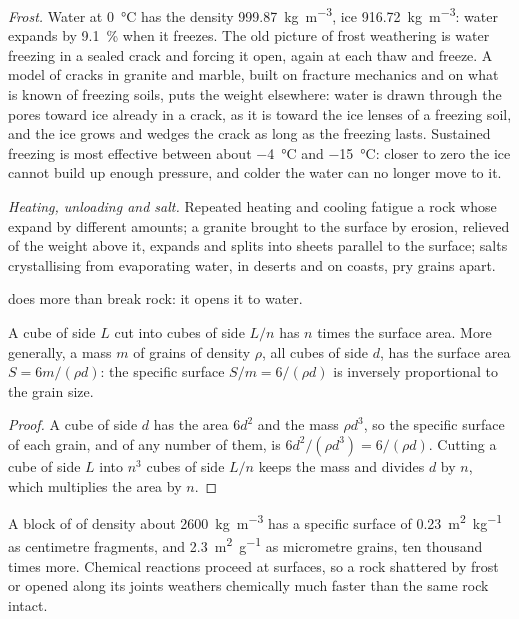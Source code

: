 \emph{Frost.} Water at \qty{0}{\celsius} has the density
\qty{999.87}{kg.m^{-3}}, ice \qty{916.72}{kg.m^{-3}}: water expands by
\qty{9.1}{\percent} when it freezes. The old picture of frost weathering is
water freezing in a sealed crack and forcing it open, again at each thaw and
freeze. A model of cracks in granite and marble, built on fracture mechanics
and on what is known of freezing soils, puts the weight elsewhere: water is
drawn through the pores toward ice already in a crack, as it is toward the
ice lenses of a freezing soil, and the ice grows and wedges the crack as long
as the freezing lasts. Sustained freezing is most effective between about
\qty{-4}{\celsius} and \qty{-15}{\celsius}: closer to zero the ice cannot
build up enough pressure, and colder the water can no longer move to it.

\emph{Heating, unloading and salt.} Repeated heating and cooling fatigue a
rock whose  expand by different amounts; a granite brought to the
surface by erosion, relieved of the weight above it, expands and splits into
sheets parallel to the surface; salts crystallising from evaporating water,
in deserts and on coasts, pry grains apart.

 does more than break rock: it opens it to water.

\begin{proposition}\label{prop:b1:weathering-clays:surface}
A cube of side $L$ cut into cubes of side $L/n$ has $n$ times the surface
area. More generally, a mass $m$ of grains of density $\rho$, all cubes of side
$d$, has the surface area $S = 6m/(\rho d)$: the specific surface $S/m =
6/(\rho d)$ is inversely proportional to the grain size.
\end{proposition}

\begin{proof}
A cube of side $d$ has the area $6d^2$ and the mass $\rho d^3$, so the
specific surface of each grain, and of any number of them, is $6d^2/(\rho d^3)
= 6/(\rho d)$. Cutting a cube of side $L$ into $n^3$ cubes of side $L/n$ keeps
the mass and divides $d$ by $n$, which multiplies the area by $n$.
\end{proof}

A block of  of density about \qty{2600}{kg.m^{-3}} has a specific
surface of \qty{0.23}{m^2.kg^{-1}} as centimetre fragments, and
\qty{2.3}{m^2.g^{-1}} as micrometre grains, ten thousand times more. Chemical
reactions proceed at surfaces, so a rock shattered by frost or opened along
its joints weathers chemically much faster than the same rock intact.

